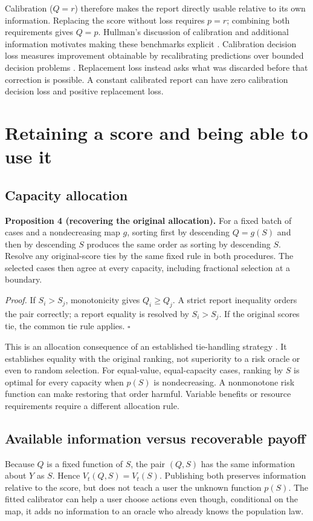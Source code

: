 Calibration ($Q=r$) therefore makes the report directly usable relative to its own information. Replacing the score without loss requires $p=r$; combining both requirements gives $Q=p$. Hullman's discussion of calibration and additional information motivates making these benchmarks explicit \citep{hullman2024enough,hullman2025conformal}. Calibration decision loss measures improvement obtainable by recalibrating predictions over bounded decision problems \citep{hu2024decision}. Replacement loss instead asks what was discarded before that correction is possible. A constant calibrated report can have zero calibration decision loss and positive replacement loss.

\clearpage
\section{Retaining a score and being able to use it}
\label{sec:recoverability}
\subsection{Capacity allocation}
\textbf{Proposition 4 (recovering the original allocation).} For a fixed batch of cases and a nondecreasing map $g$, sorting first by descending $Q=g(S)$ and then by descending $S$ produces the same order as sorting by descending $S$. Resolve any original-score ties by the same fixed rule in both procedures. The selected cases then agree at every capacity, including fractional selection at a boundary.

\emph{Proof.} If $S_i>S_j$, monotonicity gives $Q_i\geq Q_j$. A strict report inequality orders the pair correctly; a report equality is resolved by $S_i>S_j$. If the original scores tie, the common tie rule applies. \hfill$\square$

This is an allocation consequence of an established tie-handling strategy \citep{menon2012}. It establishes equality with the original ranking, not superiority to a risk oracle or even to random selection. For equal-value, equal-capacity cases, ranking by $S$ is optimal for every capacity when $p(S)$ is nondecreasing. A nonmonotone risk function can make restoring that order harmful. Variable benefits or resource requirements require a different allocation rule.

\subsection{Available information versus recoverable payoff}
Because $Q$ is a fixed function of $S$, the pair $(Q,S)$ has the same information about $Y$ as $S$. Hence $V_t(Q,S)=V_t(S)$. Publishing both preserves information relative to the score, but does not teach a user the unknown function $p(S)$. The fitted calibrator can help a user choose actions even though, conditional on the map, it adds no information to an oracle who already knows the population law.

